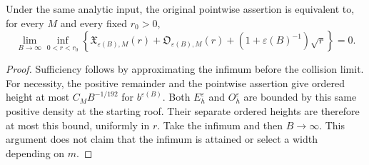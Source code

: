 \begin{corollary}
\label{cor:v79-separated-criterion}
Under the same analytic input, the original pointwise assertion is
equivalent to, for every $M$ and every fixed $r_0>0$,
\begin{equation}\label{eq:v79-separated-criterion}
 \lim_{B\to\infty}\inf_{0<r<r_0}
 \left\{\mathfrak X_{\varepsilon(B),M}(r)
       +\mathfrak O_{\varepsilon(B),M}(r)
       +(1+\varepsilon(B)^{-1})\sqrt r\right\}=0.
\end{equation}
\end{corollary}
\begin{proof}
Sufficiency follows by approximating the infimum before the collision
limit. For necessity, the positive remainder and the pointwise assertion
give ordered height at most $C_MB^{-1/192}$ for $b^{\varepsilon(B)}$.
Both $E_h^\varepsilon$ and $O_h^\varepsilon$ are bounded by this same
positive density at the starting roof. Their separate ordered heights
are therefore at most this bound, uniformly in $r$. Take the infimum
and then $B\to\infty$. This argument does not claim that the infimum
is attained or select a width depending on $m$.
\end{proof}
